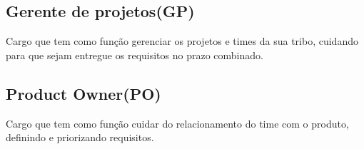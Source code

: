 \subsection{Gerente de projetos(GP)}

Cargo que tem como função gerenciar os projetos e times da sua
 tribo, cuidando para que sejam entregue os requisitos no prazo combinado.

\subsection{Product Owner(PO)}
Cargo que tem como função cuidar do relacionamento do time com o produto,
 definindo e priorizando requisitos.